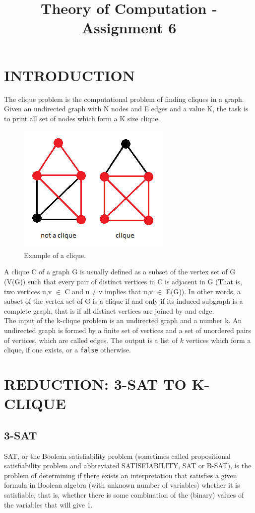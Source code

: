 \documentclass[table]{article}
\title{Theory of Computation - Assignment 6}
\begin{document}
\maketitle
\section{INTRODUCTION}
The clique problem is the computational problem of finding cliques in a graph. Given an undirected graph with N nodes and E edges and a value K, the task is to print all set of nodes which form a K size clique. 

\begin{figure}[h]
    \centering
    \includegraphics[scale=0.7]{MrlSG.png}
    \caption{Example of a clique.}\label{f1}
\end{figure}

A clique C of a graph G is usually defined as a subset of the vertex set of G (V(G)) such that every pair of distinct vertices in C is adjacent in G (That is, two vertices u,v $\in$ C and u$\neq$v implies that u,v $\in$ E(G)). In other words, a subset of the vertex set of G is a clique if and only if its induced subgraph is a complete graph, that is if all distinct vertices are joined by and edge.
\\
The input of the k-clique problem is an undirected graph and a number k. 
An undirected graph is formed by a finite set of vertices and a set of unordered pairs of vertices, which are called edges. 
The output is a list of $k$ vertices which form a clique, if one exists, or a \lstinline{false} otherwise.

\section{REDUCTION: 3-SAT TO K-CLIQUE}
\subsection{3-SAT}
SAT, or the Boolean satisfiability problem (sometimes called propositional satisfiability problem and abbreviated SATISFIABILITY, SAT or B-SAT), is the problem of determining if there exists an interpretation that satisfies a given formula in Boolean algebra (with unknown number of variables) whether it is satisfiable, that is, whether there is some combination of the (binary) values of the variables that will give 1.
\end{document}

